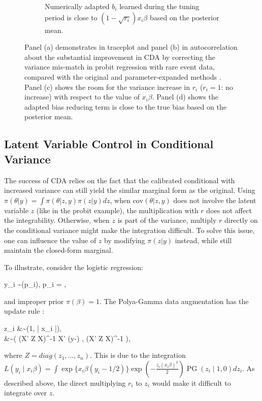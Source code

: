 \documentclass[10pt]{article}
\newcommand{\xbeta}{ x_i \beta}
\newcommand{\be}{\begin{equs}}
\newcommand{\ee}{\end{equs}}
\DeclareMathOperator{\No}{No}
\DeclareMathOperator{\PG}{PG}
\DeclareMathOperator{\Bern}{Bernoulli}
\begin{document}
\begin{figure}[H]
\begin{subfigure}[b]{0.49\textwidth}
  \caption{Numerically adapted $b_i$ learned during the tuning period is close to $(1-\sqrt{r_i} ) \xbeta$ based on the posterior mean.}
      \label{probit_reg_b}
\end{subfigure}
 \caption{Panel (a) demonstrates in traceplot and panel (b) in autocorrelation about the substantial improvement in CDA by correcting the variance mis-match in probit regression with rare event data, compared with the original \citep{albert1993bayesian} and parameter-expanded methods \citep{liu1999parameter}. Panel (c) shows the room for the variance increase in $r_i$ ($r_i=1$: no increase) with respect to the value of $\xbeta$. Panel (d) shows the adapted bias reducing term is close to the true bias based on the posterior mean.}
 \end{figure}

\subsection{Latent Variable Control in Conditional Variance}

The success of CDA relies on the fact that the calibrated conditional with increased variance can still yield the similar marginal form as the original. Using $\pi(\theta|y)=\int\pi(\theta|z,y)\pi(z|y) dz$, when $\mbox{cov}(\theta|z,y)$ does not involve the latent variable $z$ (like in the probit example), the multiplication with $r$ does not affect the integrability. Otherwise, when $z$ is part of the variance, multiply $r$ directly on the conditional variance might make the integration difficult. To solve this issue, one can influence the value of $z$ by modifying $\pi(z|y)$ instead, while still maintain the closed-form marginal.

To illustrate, consider the logistic regression:

\be
y_i \sim \Bern(p_i), \quad p_i = ,
\ee
and improper prior $\pi(\beta)=1$. The Polya-Gamma data augmentation has the update rule \citep{polson2013bayesian}:

\be
 z_i &\sim {\PG}(1, |\xbeta|),\\
\beta &\sim \No \left(  (X' Z X)^{-1}   X'  (y-)  ,  (X' Z X)^{-1}  \right),
\ee
where $Z= diag(z_1,\ldots,z_n)$. This is due to the integration $L(y_i \mid \xbeta)=  \int \exp\{ \xbeta (y_i-1/2)\} \exp(-\frac{z_i (\xbeta)^2}{2}) \PG(z_i \mid 1,0) dz_i$. As described above, the direct multiplying $r_i$ to $z_i$ would make it difficult to integrate over $z$.
\end{document}

